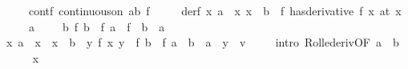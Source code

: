 \begin{isabellebody}
\ \ \ \ \ contf{\isacharcolon}{\kern0pt}\ {\isachardoublequoteopen}continuous{\isacharunderscore}{\kern0pt}on\ {\isacharbraceleft}{\kern0pt}a{\isachardot}{\kern0pt}{\isachardot}{\kern0pt}b{\isacharbraceright}{\kern0pt}\ f{\isachardoublequoteclose}\isanewline
\ \ \ \ \ derf{\isacharcolon}{\kern0pt}\ {\isachardoublequoteopen}{\isasymAnd}x{\isachardot}{\kern0pt}\ {\isasymlbrakk}a\ {\isacharless}{\kern0pt}\ x{\isacharsemicolon}{\kern0pt}\ x\ {\isacharless}{\kern0pt}\ b{\isasymrbrakk}\ {\isasymLongrightarrow}\ {\isacharparenleft}{\kern0pt}f\ has{\isacharunderscore}{\kern0pt}derivative\ f{\isacharprime}{\kern0pt}\ x{\isacharparenright}{\kern0pt}\ {\isacharparenleft}{\kern0pt}at\ x{\isacharparenright}{\kern0pt}{\isachardoublequoteclose}\isanewline
\ \ \ {\isasymxi}\ \ {\isachardoublequoteopen}a\ {\isacharless}{\kern0pt}\ {\isasymxi}{\isachardoublequoteclose}\ {\isachardoublequoteopen}{\isasymxi}\ {\isacharless}{\kern0pt}\ b{\isachardoublequoteclose}\ {\isachardoublequoteopen}f\ b\ {\isacharminus}{\kern0pt}\ f\ a\ {\isacharequal}{\kern0pt}\ {\isacharparenleft}{\kern0pt}f{\isacharprime}{\kern0pt}\ {\isasymxi}{\isacharparenright}{\kern0pt}\ {\isacharparenleft}{\kern0pt}b\ {\isacharminus}{\kern0pt}\ a{\isacharparenright}{\kern0pt}{\isachardoublequoteclose}\isanewline
%
\isadelimproof
%
\endisadelimproof
%
\isatagproof
{}\isamarkupfalse%
\ {\isacharminus}{\kern0pt}\isanewline
\ \ \isamarkupfalse%
\ {\isachardoublequoteopen}{\isasymexists}x{\isachardot}{\kern0pt}\ a\ {\isacharless}{\kern0pt}\ x\ {\isasymand}\ x\ {\isacharless}{\kern0pt}\ b\ {\isasymand}\ {\isacharparenleft}{\kern0pt}{\isasymlambda}y{\isachardot}{\kern0pt}\ f{\isacharprime}{\kern0pt}\ x\ y\ {\isacharminus}{\kern0pt}\ {\isacharparenleft}{\kern0pt}f\ b\ {\isacharminus}{\kern0pt}\ f\ a{\isacharparenright}{\kern0pt}\ {\isacharslash}{\kern0pt}\ {\isacharparenleft}{\kern0pt}b\ {\isacharminus}{\kern0pt}\ a{\isacharparenright}{\kern0pt}\ {\isacharasterisk}{\kern0pt}\ y{\isacharparenright}{\kern0pt}\ {\isacharequal}{\kern0pt}\ {\isacharparenleft}{\kern0pt}{\isasymlambda}v{\isachardot}{\kern0pt}\ {}{\isacharparenright}{\kern0pt}{\isachardoublequoteclose}\isanewline
\ \ \isamarkupfalse%
\ {\isacharparenleft}{\kern0pt}intro\ Rolle{\isacharunderscore}{\kern0pt}deriv{\isacharbrackleft}{\kern0pt}OF\ {\isacartoucheopen}a\ {\isacharless}{\kern0pt}\ b{\isacartoucheclose}{\isacharbrackright}{\kern0pt}{\isacharparenright}{\kern0pt}\isanewline
\ \ \ \ \isamarkupfalse%
\ x\isanewline

\end{isabellebody}
